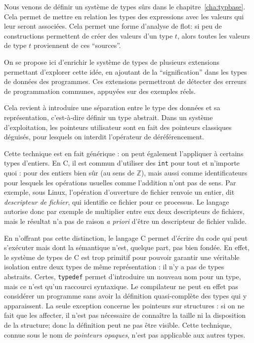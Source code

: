 

Nous venons de définir un système de types sûrs dans le
chapitre~\ref{cha:typbase}. Cela permet de mettre en relation les types des
expressions avec les valeurs qui leur seront associées. Cela permet une forme
d'analyse de flot: si peu de constructions permettent de créer des valeurs d'un
type $t$, alors toutes les valeurs de type $t$ proviennent de ces
\enquote{sources}.

On se propose ici d'enrichir le système de types de plusieurs extensions
permettant d'explorer cette idée, en ajoutant de la \enquote{signification} dans
les types de données des programmes. Ces extensions permettront de détecter des
erreurs de programmation communes, appuyées sur des exemples réels.

Cela revient à introduire une séparation entre le type des données et sa
représentation, c'est-à-dire définir un type abstrait. Dans un système
d'exploitation, les pointeurs utilisateur sont en fait des pointeurs classiques
déguisés, pour lesquels on interdit l'opérateur de déréférencement.

Cette technique est en fait générique : on peut également l'appliquer à certains
types d'entiers. En C, il est commun d'utiliser des \texttt{int} pour tout et
n'importe quoi : pour des entiers bien sûr (au sens de $ℤ$), mais aussi comme
identificateurs pour lesquels les opérations usuelles comme l'addition n'ont pas
de sens. Par exemple, sous Linux, l'opération d'ouverture de fichier renvoie un
entier, dit \emph{descripteur de fichier}, qui identifie ce fichier pour ce
processus.
Le langage autorise donc par exemple de multiplier entre
eux deux descripteurs de fichiers, mais le résultat n'a pas de raison \emph{a
priori} d'être un descripteur de fichier valide.

En n'offrant pas cette distinction, le langage C permet d'écrire du code qui
peut s'exécuter mais dont la sémantique n'est, quelque part, pas bien fondée. En
effet, le système de types de C est trop primitif pour pouvoir garantir une
véritable isolation entre deux types de même représentation : il n'y a pas de
types abstraits. Certes, \texttt{typedef} permet d'introduire un nouveau nom
pour un type, mais ce n'est qu'un raccourci syntaxique. Le compilateur ne peut
en effet pas considérer un programme sans avoir la définition quasi-complète des
types qui y apparaissent. La seule exception concerne les pointeurs sur
structures : si on ne fait que les affecter, il n'est pas nécessaire de
connaître la taille ni la disposition de la structure; donc la définition peut
ne pas être visible. Cette technique, connue sous le nom de \emph{pointeurs
opaques}, n'est pas applicable aux autres types.

